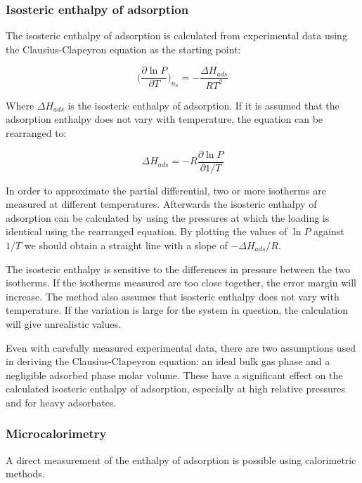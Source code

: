 \subsubsection{Isosteric enthalpy of adsorption}

The isosteric enthalpy of adsorption is calculated from experimental
data using the Clausius-Clapeyron equation as the starting point:

\begin{equation}
    \Big( \frac{\partial \ln P}{\partial T} \Big)_{n_a} = -\frac{\Delta H_{ads}}{R T^2}
\end{equation}

Where \(\Delta H_{ads}\) is the isosteric enthalpy of adsorption.
If it is assumed that the adsorption enthalpy does not vary with 
temperature, the equation can be rearranged to:

\begin{equation}
    \Delta H_{ads} = - R \frac{\partial \ln P}{\partial 1 / T}
\end{equation}

In order to approximate the partial differential, two or more
isotherms are measured at different temperatures. 
Afterwards the isosteric enthalpy of adsorption can be calculated
by using the pressures at which the loading is identical using the 
rearranged equation. By plotting the values of \(\ln P\) against
\(1 / T\) we should obtain a straight line with a slope
of \(- \Delta H_{ads} / R\).

The isosteric enthalpy is sensitive to the differences in pressure between
the two isotherms. If the isotherms measured are too close together, 
the error margin will increase. The method also assumes that isosteric
enthalpy does not vary with temperature. If the
variation is large for the system in question, the calculation will
give unrealistic values.

Even with carefully measured experimental data, there are two 
assumptions used in deriving the Clausius-Clapeyron equation: 
an ideal bulk gas phase and a negligible adsorbed phase
molar volume. These have a significant effect on the calculated 
isosteric enthalpy of adsorption, especially at high relative pressures 
and for heavy adsorbates.

\subsubsection{Microcalorimetry}

A direct measurement of the enthalpy of adsorption is possible using
calorimetric methods.

